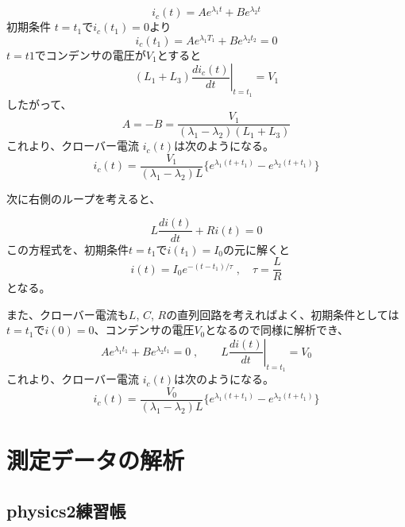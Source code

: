 \documentclass[book,openany]{jlreq}
\theoremstyle{definition}
\begin{document}
%
\begin{equation}
  i_c(t) = A e^{\lambda_1 t} + B e^{\lambda_2 t}
\end{equation}
%
初期条件 $t=t_1$で$i_c(t_1)=0$より
%
\begin{equation}
  i_c(t_1) = A e^{\lambda_1 T_1} + B e^{\lambda_2 t_2} = 0
\end{equation}
%
$t=t1$でコンデンサの電圧が$V_1$とすると
%
\begin{equation}
  (L_1+L_3)\left. \frac{di_c(t)}{dt} \right|_{t=t_1}= V_1
\end{equation}
%
したがって、
\begin{equation}
  A = -B = \frac{V_1}{(\lambda_1 - \lambda_2)(L_1+L_3)}
\end{equation}
%
%
これより、クローバー電流 $i_c(t)$は次のようになる。
\begin{equation}
  i_c(t) = \frac{V_1}{(\lambda_1-\lambda_2)L}\bigl\{e^{\lambda_1(t+t_1)}-e^{\lambda_2(t+t_1)}\bigr\}
\end{equation}

次に右側のループを考えると、

\begin{equation}
  L \frac{di(t)}{dt} + R i(t) = 0
\end{equation}
%
この方程式を、初期条件$t=t_1$で$i(t_1)=I_0$の元に解くと
%
\begin{equation}
  i(t) = I_0 e^{-(t-t_1)/\tau}\;,\quad \tau = \frac{L}{R}
\end{equation}
%
となる。

また、クローバー電流も$L$, $C$, $R$の直列回路を考えればよく、初期条件としては$t=t_1$で$i(0)=0$、コンデンサの電圧$V_0$となるので同様に解析でき、
%
\begin{equation}
  A e^{\lambda_1 t_1}+B e^{\lambda_2 t_1} = 0\;,\qquad L\left .\frac{di(t)}{dt} \right|_{t=t_1}=V_0
\end{equation}
%
これより、クローバー電流 $i_c(t)$は次のようになる。
\begin{equation}
  i_c(t) = \frac{V_0}{(\lambda_1-\lambda_2)L}\bigl\{e^{\lambda_1(t+t_1)}-e^{\lambda_2(t+t_1)}\bigr\}
\end{equation}
%
\chapter{測定データの解析}

\clearpage

\section{physics2練習帳}
\end{document}
